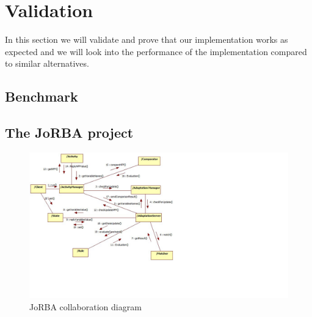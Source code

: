 \section{Validation}
In this section we will validate and prove that our implementation works as expected and we will look into the performance of the implementation compared to similar alternatives.
\subsection{Benchmark}
\subsection{The JoRBA project}
\begin{figure}[]
  \includegraphics[width=\textwidth]{illustrations/Jorba.png}
  \caption{JoRBA collaboration diagram}
\end{figure}
\newpage